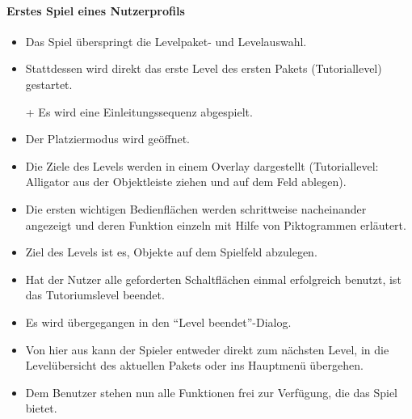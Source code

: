 \paragraph{Erstes Spiel eines Nutzerprofils}\mbox{}\newline
\begin{itemize}
\item Das Spiel überspringt die Levelpaket- und Levelauswahl.
\item Stattdessen wird direkt das erste Level des ersten Pakets (Tutoriallevel) gestartet.
\item[+] Es wird eine Einleitungssequenz abgespielt.
\item Der Platziermodus wird geöffnet.
\item Die Ziele des Levels werden in einem Overlay dargestellt (Tutoriallevel: Alligator aus der Objektleiste ziehen und auf dem Feld ablegen).
\item Die ersten wichtigen Bedienflächen werden schrittweise nacheinander angezeigt und deren Funktion
einzeln mit Hilfe von Piktogrammen erläutert.
\item Ziel des Levels ist es, Objekte auf dem Spielfeld abzulegen.
\item Hat der Nutzer alle geforderten Schaltflächen einmal erfolgreich benutzt, ist das Tutoriumslevel beendet.
\item Es wird übergegangen in den "`Level beendet"'-Dialog. 
\item Von hier aus kann der Spieler entweder direkt zum nächsten Level, in die Levelübersicht des aktuellen Pakets oder
ins Hauptmenü übergehen.
\item Dem Benutzer stehen nun alle Funktionen frei zur Verfügung, die das Spiel 
bietet.
\end{itemize}
